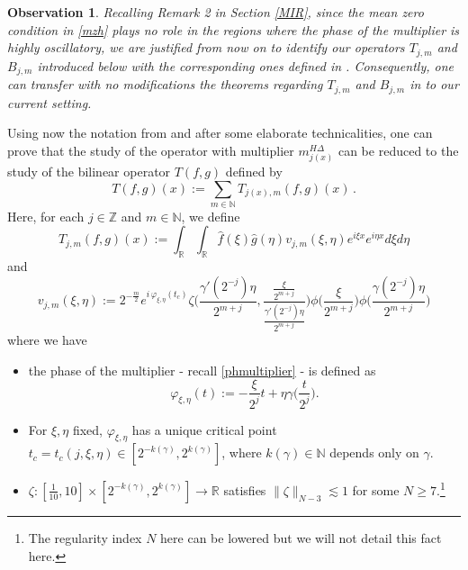 \documentclass{amsart}
\newcommand{\R}{\mathbb{R}}
\newcommand{\Z}{\mathbb{Z}}
\newcommand{\N}{\mathbb{N}}
\newtheorem{observation}[theorem]{Observation}
\theoremstyle{definition}
\theoremstyle{remark}
\numberwithin{equation}{section}
\begin{document}
\begin{observation}\label{identif} Recalling Remark 2 in Section \ref{MIR}, since the mean zero condition in \eqref{mzh} plays no role in the regions where the phase of the multiplier is highly oscillatory, we are justified from now on to identify our operators $T_{j,m}$ and $B_{j,m}$ introduced below with the corresponding ones defined in \cite{lie2015boundedness}. Consequently, one can transfer with no modifications the theorems regarding $T_{j,m}$ and $B_{j,m}$ in \cite{lie2015boundedness} to our current setting.
\end{observation}

Using now the notation from \cite[Section 3]{lie2015triangle} and after some elaborate technicalities, one can prove that the study of the operator with multiplier $m_{j(x)}^{H\Delta}$ can be reduced to the study of the bilinear operator $T(f,g)$ defined by
\begin{equation}\label{T}
 T(f,g)(x):=\sum_{m\in\N}T_{j(x),m}(f,g)(x)\,.
\end{equation}
Here, for each $j\in\Z$ and $m\in\N$, we define
\begin{equation}\label{Tjm}
T_{j,m}(f,g)(x):=\int_\R\int_\R\hat{f}(\xi)\hat{g}(\eta)v_{j,m}(\xi,\eta)e^{i\xi x}e^{i\eta x} d\xi d\eta
\end{equation}
and
\begin{equation}\label{vjm}
v_{j,m}(\xi,\eta):=2^{-\frac{m}{2}}e^{i\,\varphi_{\xi,\eta}(t_c)} \zeta\Bigg(\frac{\gamma'(2^{-j})\eta}{2^{m+j}},
\frac{\frac{\xi}{2^{m+j}}}{\frac{\gamma'(2^{-j})\eta}{2^{m+j}}}\Bigg) \phi\Big(\frac{\xi}{2^{m+j}}\Big) \phi\Big(\frac{\gamma(2^{-j})\eta}{2^{m+j}}\Big)
\end{equation}
where we have
\begin{itemize}
 \item the phase of the multiplier - recall \eqref{phmultiplier} - is defined as
 \begin{equation}
\varphi_{\xi,\eta}(t):=-\frac{\xi}{2^j}t+\eta\gamma\big(\frac{t}{2^j}\big).
 \end{equation}
 \item For $\xi,\eta$ fixed, $\varphi_{\xi,\eta}$ has a unique critical point $t_c=t_c(j,\xi,\eta) \in [2^{-k(\gamma)},2^{k(\gamma)}]$, where $k(\gamma)\in\N$ depends only on $\gamma$.
 \item $\zeta:[\frac{1}{10},10]\times[2^{-k(\gamma)},2^{k(\gamma)}]\to\R$ satisfies $\|\zeta\|_{N-3}\lesssim  1$ for some $N\ge7$.\footnote{The regularity index $N$ here can be lowered but we will not detail this fact here.}
\end{itemize}
\end{document}
